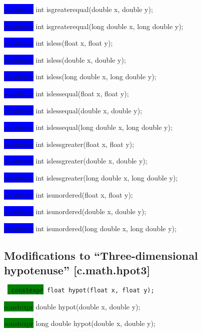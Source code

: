 \documentclass[prd,twocolumn,amsmath,amssymb,nofootinbib,eqsecnum]{revtex4-1}
\newcommand{\code}[1]{{\tt #1}}
\newcommand{\highlight}[1]{\colorbox{green}{\!\!\!\! #1}}
\newcommand{\oldhighlight}[1]{\colorbox{blue}{\!\!\!\! #1}}
\begin{document}
{\oldhighlight{constexpr} int isgreaterequal(double x, double y);

\oldhighlight{constexpr} int isgreaterequal(long double x, long double y);

\vspace{2ex}


\oldhighlight{constexpr} int isless(float x, float y);

\oldhighlight{constexpr} int isless(double x, double y);

\oldhighlight{constexpr} int isless(long double x, long double y);

\vspace{2ex}


\oldhighlight{constexpr} int islessequal(float x, float y);

\oldhighlight{constexpr} int islessequal(double x, double y);

\oldhighlight{constexpr} int islessequal(long double x, long double y);

\vspace{2ex}


\oldhighlight{constexpr} int islessgreater(float x, float y);

\oldhighlight{constexpr} int islessgreater(double x, double y);

\oldhighlight{constexpr} int islessgreater(long double x, long double y);

\vspace{2ex}


\oldhighlight{constexpr} int isunordered(float x, float y);

\oldhighlight{constexpr} int isunordered(double x, double y);

\oldhighlight{constexpr} int isunordered(long double x, long double y);

}


\subsection{Modifications to ``Three-dimensional hypotenuse''  [c.math.hpot3]}

\code{
	\highlight{constexpr} float hypot(float x, float y); 

	\highlight{constexpr} double hypot(double x, double y);

	\highlight{constexpr} long double hypot(double x, double y); 
}
\end{document}
